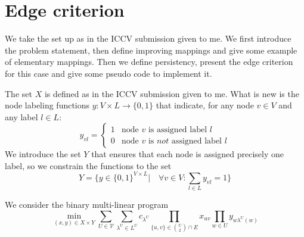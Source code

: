 \section{Edge criterion}

We take the set up as in the ICCV submission given to me. 
We first introduce the problem statement, then define improving mappings and give some example of elementary mappings. Then we define persistency, present the edge criterion for this case and give some pseudo code to implement it. 

The set $X$ is defined as in the ICCV submission given to me. What is new is the node labeling functions $y: V \times L \to \{0,1\}$ that indicate, for any node $v \in V$ and any label $l \in L$: 
\begin{equation}
    y_{vl}=\begin{cases}
    1 & \text{node $v$ is assigned label $l$} \\
    0 & \text{node $v$ is } \textit{not } \text{assigned label $l$}
    \end{cases}
\end{equation}
We introduce the set $Y$ that ensures that each node is assigned precisely one label, so we constrain the functions to the set \[ Y= \Big\{ y \in \{0,1\}^{V \times L} \Big| \quad \forall v \in V: \sum_{l \in L} y_{vl}=1 \Big\} \]

We consider the binary multi-linear program 
\begin{equation}
\tag{P}
    \min_{(x,y) \in X \times Y } \sum_{U \in \mathcal{V}} \sum_{\lambda^U \in L^U} c_{\lambda^U} \prod_{\{u,v\} \in \binom{U}{2} \cap E} x_{uv} \prod_{w \in U} y_{w \lambda^U(w)}
\end{equation}

